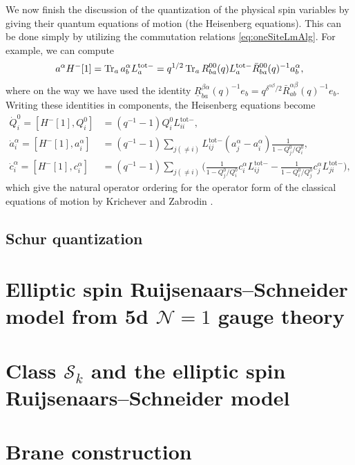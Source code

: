 We now finish the discussion of the quantization of the physical spin variables by giving their quantum equations of motion (the Heisenberg equations). This can be done simply by utilizing the commutation relations \eqref{eq:oneSiteLmAlg}. For example, we can compute
\begin{align}
    a^\alpha H^-[1] = \operatorname{Tr}_a a_b^\alpha L_a^{\text{tot}-} = q^{1/2} \operatorname{Tr}_a R_{ba}^{00}(q) L_a^{\text{tot}-} \bar R_{ba}^{00}(q)^{-1} a_b^\alpha,
\end{align}
where on the way we have used the identity $\underline R_{ba}^{\beta\alpha}(q)^{-1} e_b = q^{\delta^{\alpha\beta}/2} \bar R_{ab}^{\alpha\beta}(q)^{-1} e_b$. Writing these identities in components, the Heisenberg equations become
\begin{align}
    \dot{Q}_i^0=   [H^-[1],Q_i^0] &= (q^{-1}-1) Q_i^0 L_{ii}^{\text{tot}-}, \label{eq:eoms1} \\[8pt]
    \dot{a}_i^\alpha=  [H^-[1],a_i^\alpha] &= (q^{-1}-1) \sum_{j(\neq i)} L_{ij}^{\text{tot}-} (a_j^\alpha-a_i^\alpha) \frac{1}{1-Q_j^0/Q_i^0}, \\[-2pt]
    \dot{c}_i^\alpha=  [H^-[1],c_i^\alpha] &= (q^{-1}-1) \sum_{j(\neq i)} \bigg( \frac{1}{1-Q_j^0/Q_i^0} c_i^\alpha L_{ij}^{\text{tot}-} - \frac{1}{1-Q_i^0/Q_j^0} c_j^\alpha L_{ji}^{\text{tot}-} \bigg), \label{eq:eoms2}
\end{align}
which give the natural operator ordering for the operator form of the classical equations of motion by Krichever and Zabrodin \cite{krichever_spin_1995}.


\subsection{Schur quantization}

\section{Elliptic spin Ruijsenaars--Schneider model from 5d $\mathcal{N}=1$ gauge theory}

\cite{murinov_classical_2025}

\section{Class $\mathcal{S}_k$ and the elliptic spin Ruijsenaars--Schneider model}

\section{Brane construction}

\cite{maruyoshi_wilson-t_2021}